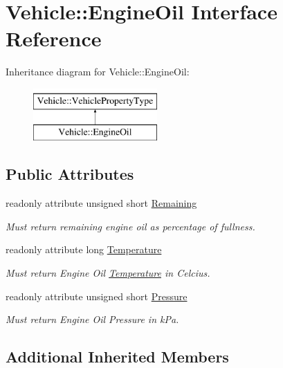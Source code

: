 \hypertarget{interfaceVehicle_1_1EngineOil}{\section{Vehicle\-:\-:Engine\-Oil Interface Reference}
\label{interfaceVehicle_1_1EngineOil}
}
Inheritance diagram for Vehicle\-:\-:Engine\-Oil\-:\begin{figure}[H]
\begin{center}
\leavevmode
\includegraphics[height=2.000000cm]{interfaceVehicle_1_1EngineOil}
\end{center}
\end{figure}
\subsection*{Public Attributes}
\begin{DoxyCompactItemize}
\item 
readonly attribute unsigned short \hyperlink{interfaceVehicle_1_1EngineOil_a8ec4d786322d1a340aed509440163d9a}{Remaining}
\begin{DoxyCompactList}\small\item\em Must return remaining engine oil as percentage of fullness. \end{DoxyCompactList}\item 
readonly attribute long \hyperlink{interfaceVehicle_1_1EngineOil_ac6d334def81cd936b962933e07becee1}{Temperature}
\begin{DoxyCompactList}\small\item\em Must return Engine Oil \hyperlink{interfaceVehicle_1_1Temperature}{Temperature} in Celcius. \end{DoxyCompactList}\item 
readonly attribute unsigned short \hyperlink{interfaceVehicle_1_1EngineOil_a9da192a4b8b3364e121595d8be8dd802}{Pressure}
\begin{DoxyCompactList}\small\item\em Must return Engine Oil Pressure in k\-Pa. \end{DoxyCompactList}\end{DoxyCompactItemize}
\subsection*{Additional Inherited Members}


